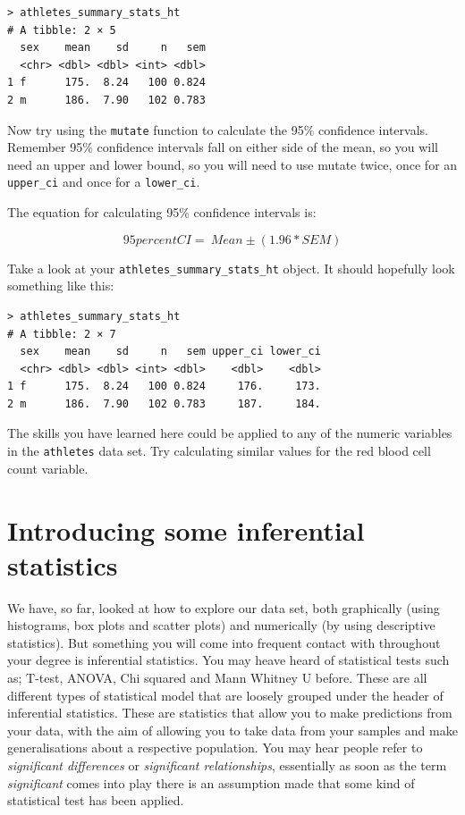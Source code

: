 \documentclass[
]{book}
\begin{document}
\begin{verbatim}
> athletes_summary_stats_ht
# A tibble: 2 × 5
  sex    mean    sd     n   sem 
  <chr> <dbl> <dbl> <int> <dbl>
1 f      175.  8.24   100 0.824
2 m      186.  7.90   102 0.783 
\end{verbatim}

Now try using the \texttt{mutate} function to calculate the 95\% confidence intervals. Remember 95\% confidence intervals fall on either side of the mean, so you will need an upper and lower bound, so you will need to use mutate twice, once for an \texttt{upper\_ci} and once for a \texttt{lower\_ci}.

The equation for calculating 95\% confidence intervals is:

\[
95percent CI = \ Mean ± (1.96 * SEM)
\]

Take a look at your \texttt{athletes\_summary\_stats\_ht} object. It should hopefully look something like this:

\begin{verbatim}
> athletes_summary_stats_ht
# A tibble: 2 × 7
  sex    mean    sd     n   sem upper_ci lower_ci
  <chr> <dbl> <dbl> <int> <dbl>    <dbl>    <dbl>
1 f      175.  8.24   100 0.824     176.     173.
2 m      186.  7.90   102 0.783     187.     184.
\end{verbatim}

The skills you have learned here could be applied to any of the numeric variables in the \texttt{athletes} data set. Try calculating similar values for the red blood cell count variable.

\hypertarget{introducing-some-inferential-statistics}{%
\section{Introducing some inferential statistics}\label{introducing-some-inferential-statistics}}

We have, so far, looked at how to explore our data set, both graphically (using histograms, box plots and scatter plots) and numerically (by using descriptive statistics). But something you will come into frequent contact with throughout your degree is inferential statistics. You may heave heard of statistical tests such as; T-test, ANOVA, Chi squared and Mann Whitney U before. These are all different types of statistical model that are loosely grouped under the header of inferential statistics. These are statistics that allow you to make predictions from your data, with the aim of allowing you to take data from your samples and make generalisations about a respective population. You may hear people refer to \emph{significant differences} or \emph{significant relationships}, essentially as soon as the term \emph{significant} comes into play there is an assumption made that some kind of statistical test has been applied.
\end{document}
